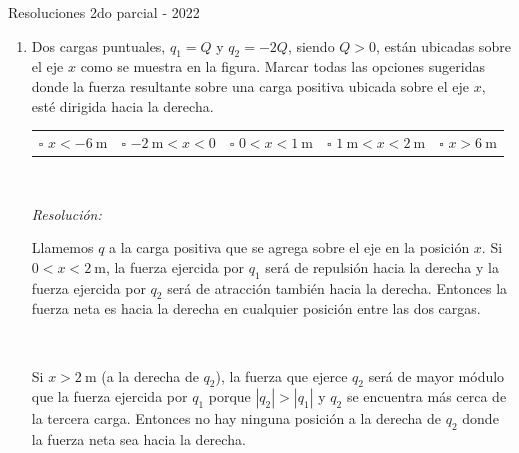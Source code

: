 \documentclass[a4paper,11pt,dvipsnames]{article}
\begin{document}
{\Large Resoluciones 2do parcial - 2022}

\begin{enumerate}[leftmargin=*]
  \item Dos cargas puntuales, $q_1 = Q$ y $q_2 = -2Q$, siendo $Q>0$, están ubicadas sobre el eje $x$ como se muestra en la figura. Marcar todas las opciones sugeridas donde la fuerza resultante sobre una carga positiva ubicada sobre el eje $x$, esté dirigida hacia la derecha.
  \begin{center}
  \end{center}
  \begin{tabularx}{\textwidth}{XXXXX}
  $\square$ $x < \SI{-6}{\metre}$ & $\square$ $\SI{-2}{\metre} < x < 0$ & $\square$ $0 < x < \SI{1}{\metre}$ & $\square$ $\SI{1}{\metre} < x < \SI{2}{\metre}$ & $\square$ $ x > \SI{6}{\metre}$ \\
  \end{tabularx}

\

\textit{Resolución:}

Llamemos $q$ a la carga positiva que se agrega sobre el eje en la posición $x$. Si $0 < x < \SI{2}{\metre}$, la fuerza ejercida por $q_1$ será de repulsión hacia la derecha y la fuerza ejercida por $q_2$ será de atracción también hacia la derecha. Entonces la fuerza neta es hacia la derecha en cualquier posición entre las dos cargas.

\

Si $ x > \SI{2}{\metre}$ (a  la derecha de $q_2$), la fuerza que ejerce $q_2$ será de mayor módulo que la fuerza ejercida por $q_1$ porque $|q_2| > |q_1|$ y $q_2$ se encuentra más cerca de la tercera carga. Entonces no hay ninguna posición a la derecha de $q_2$ donde la fuerza neta sea hacia la derecha.


\end{enumerate}
\end{document}
